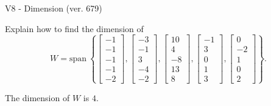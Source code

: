 \begin{exercise}
  \begin{exerciseTitle}V8 - Dimension (ver. 679)\end{exerciseTitle}
  \begin{exerciseStatement}
    Explain how to find the dimension of 
\[W=\mathrm{span}\ \left\{\left[\begin{array}{r}
-1 \\
-1 \\
-1 \\
-1 \\
-2
\end{array}\right] , \left[\begin{array}{r}
-3 \\
-1 \\
3 \\
-4 \\
-2
\end{array}\right] , \left[\begin{array}{r}
10 \\
4 \\
-8 \\
13 \\
8
\end{array}\right] , \left[\begin{array}{r}
-1 \\
3 \\
0 \\
1 \\
3
\end{array}\right] , \left[\begin{array}{r}
0 \\
-2 \\
1 \\
0 \\
2
\end{array}\right]\right\}.\]



  \end{exerciseStatement}
  \begin{exerciseAnswer}
   The dimension of \(W\) is  \(4\).
  


  \end{exerciseAnswer}
\end{exercise}